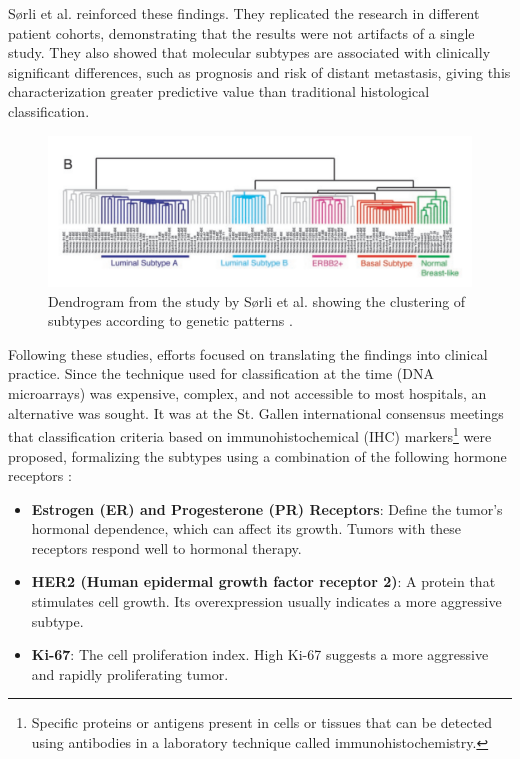 \documentclass[a4paper,10pt]{book}
\begin{document}
Sørli et al. reinforced these findings. They replicated the research in different patient cohorts, demonstrating that the results were not artifacts of a single study. They also showed that molecular subtypes are associated with clinically significant differences, such as prognosis and risk of distant metastasis, giving this characterization greater predictive value than traditional histological classification.

\begin{figure}
	\centering
	\includegraphics[width=0.8\linewidth]{reports//assets/dendogram.png}
	\caption[Molecular subtypes dendrogram by Sørli et al.]{Dendrogram from the study by Sørli et al. showing the clustering of subtypes according to genetic patterns \cite{sorlie_repeated_2003}.}
	\label{fig:sorlie-dandrogram}
\end{figure}

Following these studies, efforts focused on translating the findings into clinical practice. Since the technique used for classification at the time (DNA microarrays) was expensive, complex, and not accessible to most hospitals, an alternative was sought. It was at the St. Gallen international consensus meetings that classification criteria based on immunohistochemical (IHC) markers\footnote{Specific proteins or antigens present in cells or tissues that can be detected using antibodies in a laboratory technique called immunohistochemistry.} were proposed, formalizing the subtypes using a combination of the following hormone receptors \cite{lips_breast_2013}:

\begin{itemize}
	\item \textbf{Estrogen (ER) and Progesterone (PR) Receptors}: Define the tumor’s hormonal dependence, which can affect its growth. Tumors with these receptors respond well to hormonal therapy.
	\item \textbf{HER2 (Human epidermal growth factor receptor 2)}: A protein that stimulates cell growth. Its overexpression usually indicates a more aggressive subtype.
	\item \textbf{Ki-67}: The cell proliferation index. High Ki-67 suggests a more aggressive and rapidly proliferating tumor.
\end{itemize}
\end{document}
